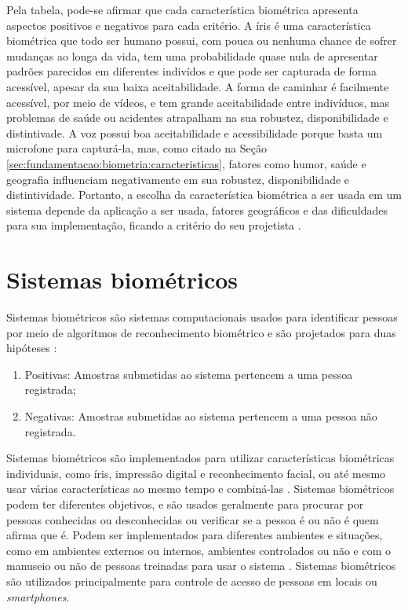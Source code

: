\par Pela tabela, pode-se afirmar que cada característica biométrica apresenta aspectos positivos e negativos para cada critério. A íris é uma característica biométrica que todo ser humano possui, com pouca ou nenhuma chance de sofrer mudanças ao longa da vida, tem uma probabilidade quase nula de apresentar padrões parecidos em diferentes indivídos e que pode ser capturada de forma acessível, apesar da sua baixa aceitabilidade. A forma de caminhar é facilmente acessível, por meio de vídeos, e tem grande aceitabilidade entre indivíduos, mas problemas de saúde ou acidentes atrapalham na sua robustez, disponibilidade e distintivade. A voz possui boa aceitabilidade e acessibilidade porque basta um microfone para capturá-la, mas, como citado na Seção \ref{sec:fundamentacao:biometria:caracteristicas}, fatores como humor, saúde e geografia influenciam negativamente em sua robustez, disponibilidade e distintividade. Portanto, a escolha da característica biométrica a ser usada em um sistema depende da aplicação a ser usada, fatores geográficos e das dificuldades para sua implementação, ficando a critério do seu projetista \cite{wayman2005biometric}.

\section{Sistemas biométricos}\label{sec:fundamentacao:sis_bio}

\par Sistemas biométricos são sistemas computacionais usados para identificar pessoas por meio de algoritmos de reconhecimento biométrico e são projetados para duas hipóteses \cite{wayman2005biometric}: 

\begin{enumerate}
    \item Positivas: Amostras submetidas ao sistema pertencem a uma pessoa registrada;
    \item Negativas: Amostras submetidas ao sistema pertencem a uma pessoa não registrada.
\end{enumerate}

\par Sistemas biométricos são implementados para utilizar características biométricas individuais, como íris, impressão digital e reconhecimento facial, ou até mesmo usar várias características ao mesmo tempo e combiná-las \cite{zhou2012,jagadiswary2016}. Sistemas biométricos podem ter diferentes objetivos, e são usados geralmente para procurar por pessoas conhecidas ou desconhecidas ou verificar se a pessoa é ou não é quem afirma que é. Podem ser implementados para diferentes ambientes e situações, como em ambientes externos ou internos, ambientes controlados ou não e com o manuseio ou não de pessoas treinadas para usar o sistema \cite{wayman2005biometric}. Sistemas biométricos são utilizados principalmente para controle de acesso de pessoas em locais ou \textit{smartphones}.

